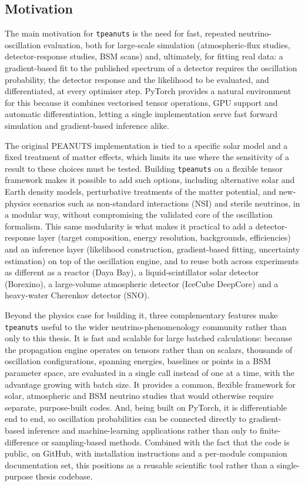 \subsection{Motivation}

The main motivation for \texttt{tpeanuts} is the need for fast, repeated neutrino-oscillation evaluation, both for large-scale simulation (atmospheric-flux studies, detector-response studies, BSM scans) and, ultimately, for fitting real data: a gradient-based fit to the published spectrum of a detector requires the oscillation probability, the detector response and the likelihood to be evaluated, and differentiated, at every optimiser step. PyTorch provides a natural environment for this because it combines vectorised tensor operations, GPU support and automatic differentiation, letting a single implementation serve fast forward simulation and gradient-based inference alike.

The original PEANUTS implementation is tied to a specific solar model and a fixed treatment of matter effects, which limits its use where the sensitivity of a result to these choices must be tested. Building \texttt{tpeanuts} on a flexible tensor framework makes it possible to add such options, including alternative solar and Earth density models, perturbative treatments of the matter potential, and new-physics scenarios such as non-standard interactions (NSI) and sterile neutrinos, in a modular way, without compromising the validated core of the oscillation formalism. This same modularity is what makes it practical to add a detector-response layer (target composition, energy resolution, backgrounds, efficiencies) and an inference layer (likelihood construction, gradient-based fitting, uncertainty estimation) on top of the oscillation engine, and to reuse both across experiments as different as a reactor (Daya Bay), a liquid-scintillator solar detector (Borexino), a large-volume atmospheric detector (IceCube DeepCore) and a heavy-water Cherenkov detector (SNO).

Beyond the physics case for building it, three complementary features make \texttt{tpeanuts} useful to the wider neutrino-phenomenology community rather than only to this thesis. It is fast and scalable for large batched calculations: because the propagation engine operates on tensors rather than on scalars, thousands of oscillation configurations, spanning energies, baselines or points in a BSM parameter space, are evaluated in a single call instead of one at a time, with the advantage growing with batch size. It provides a common, flexible framework for solar, atmospheric and BSM neutrino studies that would otherwise require separate, purpose-built codes. And, being built on PyTorch, it is differentiable end to end, so oscillation probabilities can be connected directly to gradient-based inference and machine-learning applications rather than only to finite-difference or sampling-based methods. Combined with the fact that the code is public, on GitHub, with installation instructions and a per-module companion documentation set, this positions as a reusable scientific tool rather than a single-purpose thesis codebase.


